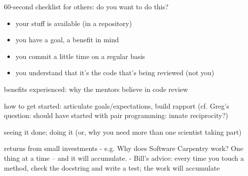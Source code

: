 \documentclass[10pt,twocolumn]{article}
\begin{document}
60-second checklist for others:  do you want to do this?

\begin{itemize}
\item your stuff is available (in a repository)
\item you have a goal, a benefit in mind
\item you commit a little time on a regular basis
\item you understand that it’s the code that’s being reviewed (not you)
\end{itemize}

benefits experienced: why the mentors believe in code review

how to get started:  articulate goals/expectations, build rapport
(cf. Greg’s question:  should have started with pair programming:  innate reciprocity?)

 seeing it done; doing it (or, why you need more than one scientist taking part)

 returns from small investments
- e.g. Why does Software Carpentry work?  One thing at a time – and it will accumulate.
- Bill’s advice:  every time you touch a method, check the docstring and write a test; the work will accumulate

{\small


}
\end{document}

